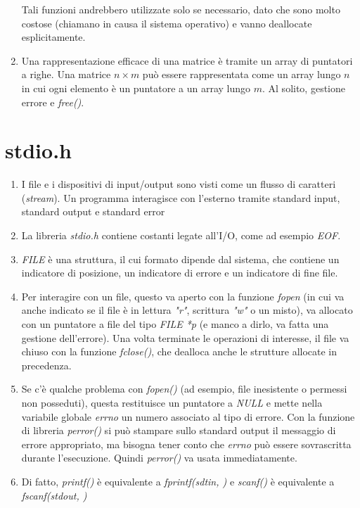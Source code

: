 \documentclass[a4paper,11pt]{article}
\begin{document}
\begin{enumerate}[resume]
\begin{itemize}
	\end{itemize}
	Tali funzioni andrebbero utilizzate solo se necessario, dato che sono molto costose (chiamano in causa il sistema operativo) e vanno deallocate esplicitamente.
	\item Una rappresentazione efficace di una matrice è tramite un array di puntatori a righe. Una matrice $n\times m$ può essere rappresentata come un array lungo $n$ in cui ogni elemento è un puntatore a un array lungo $m$. Al solito, gestione errore e \textit{free()}.
\end{enumerate}
\section{stdio.h}
\begin{enumerate}[resume]
	\item I file e i dispositivi di input/output sono visti come un flusso di caratteri (\textit{stream}). Un programma interagisce con l'esterno tramite standard input, standard output e standard error
	\item La libreria \textit{stdio.h} contiene costanti legate all'I/O, come ad esempio \textit{EOF}. 
	\item \textit{FILE} è una struttura, il cui formato dipende dal sistema, che contiene un indicatore di posizione, un indicatore di errore e un indicatore di fine file.
	\item Per interagire con un file, questo va aperto con la funzione \textit{fopen} (in cui va anche indicato se il file è in lettura \textit{"r"}, scrittura \textit{"w"} o un misto), va allocato con un puntatore a file del tipo \textit{FILE *p} (e manco a dirlo, va fatta una gestione dell'errore). Una volta terminate le operazioni di interesse, il file va chiuso con la funzione \textit{fclose()}, che dealloca anche le strutture allocate in precedenza.
	\item Se c'è qualche problema con \textit{fopen()} (ad esempio, file inesistente o permessi non posseduti), questa restituisce un puntatore a \textit{NULL} e mette nella variabile globale \textit{errno} un numero associato al tipo di errore. Con la funzione di libreria \textit{perror()} si può stampare sullo standard output il messaggio di errore appropriato, ma bisogna tener conto che \textit{errno} può essere sovrascritta durante l'esecuzione. Quindi \textit{perror()} va usata immediatamente.
	\item Di fatto, \textit{printf()} è equivalente a \textit{fprintf(sdtin, )} e \textit{scanf()} è equivalente a \textit{fscanf(stdout, )}

\end{enumerate}
\end{document}
